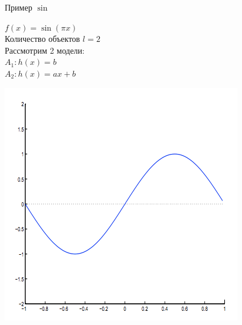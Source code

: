 \documentclass[10pt]{beamer}
\begin{document}
\begin{frame}{Пример $\sin$}
  \centering
  \begin{minipage}[b]{.45\textwidth}
    $f(x) = \sin (\pi x)$\\
    Количество объектов $l = 2$\\
    \bigbreak 
    Рассмотрим 2 модели:\\

      $A_1: h(x) = b$\\
      $A_2: h(x) = ax + b$

  \end{minipage}\qquad
  \begin{minipage}[b]{.45\textwidth}
    \includegraphics[width=\textwidth, keepaspectratio]{images/sin0}
  \end{minipage}
\end{frame}
\end{document}
